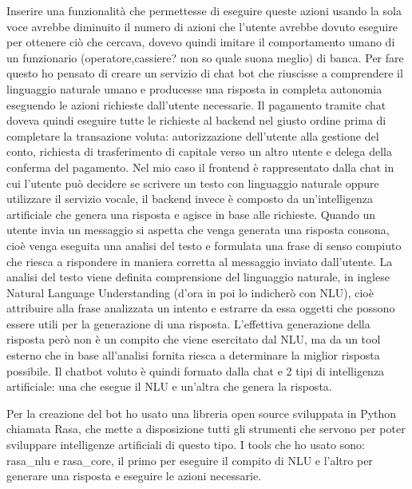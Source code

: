 Inserire una funzionalità che permettesse di eseguire queste azioni usando la sola voce avrebbe diminuito il numero di azioni che l'utente avrebbe dovuto eseguire per ottenere ciò che cercava, dovevo quindi imitare il comportamento umano di un funzionario (operatore,cassiere? non so quale suona meglio) di banca. Per fare questo ho pensato di creare un servizio di chat bot che riuscisse a comprendere il linguaggio naturale umano e producesse una risposta in completa autonomia eseguendo le azioni richieste dall'utente necessarie.
Il pagamento tramite chat doveva quindi eseguire tutte le richieste al backend nel giusto ordine prima di completare la transazione voluta: autorizzazione dell'utente alla gestione del conto, richiesta di trasferimento di capitale verso un altro utente e delega della conferma del pagamento.
Nel mio caso il frontend è rappresentato dalla chat in cui l'utente può decidere se scrivere un testo con linguaggio naturale oppure utilizzare il servizio vocale, il backend invece è composto da un'intelligenza artificiale che genera una risposta e agisce in base alle richieste.
Quando un utente invia un messaggio si aspetta che venga generata una risposta consona, cioè venga eseguita una analisi del testo e formulata una frase di senso compiuto che riesca a rispondere in maniera corretta al messaggio inviato dall'utente. La analisi del testo viene definita comprensione del linguaggio naturale, in inglese Natural Language Understanding (d'ora in poi lo indicherò con NLU), cioè attribuire alla frase analizzata un intento e estrarre da essa oggetti che possono essere utili per la generazione di una risposta. L'effettiva generazione della risposta però non è un compito che viene esercitato dal NLU, ma da un tool esterno che in base all'analisi fornita riesca a determinare la miglior risposta possibile.
Il chatbot voluto è quindi formato dalla chat e 2 tipi di intelligenza artificiale: una che esegue il NLU e un'altra che genera la risposta.
\iffalse
https://en.wikipedia.org/wiki/Natural-language_understanding
https://www.expertsystem.com/natural-language-understanding-different-nlp/
https://rasa.com/
https://rasa.com/docs/get\_started\_step1/
https://www.techopedia.com/definition/33013/natural-language-understanding-nlu
https://www.sisense.com/glossary/natural-language-understanding/
\fi
Per la creazione del bot ho usato una libreria open source sviluppata in Python chiamata Rasa, che mette a disposizione tutti gli strumenti che servono per poter sviluppare intelligenze artificiali di questo tipo. I tools che ho usato sono: rasa\_nlu e rasa\_core, il primo per eseguire il compito di NLU e l'altro per generare una risposta e eseguire le azioni necessarie.
